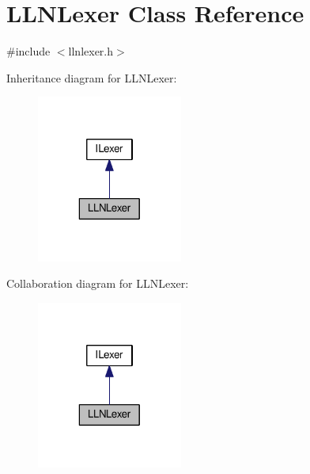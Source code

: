 \hypertarget{class_l_l_n_lexer}{\section{L\-L\-N\-Lexer Class Reference}
\label{class_l_l_n_lexer}
}


{\ttfamily \#include $<$llnlexer.\-h$>$}



Inheritance diagram for L\-L\-N\-Lexer\-:
\nopagebreak
\begin{figure}[H]
\begin{center}
\leavevmode
\includegraphics[width=136pt]{class_l_l_n_lexer__inherit__graph}
\end{center}
\end{figure}


Collaboration diagram for L\-L\-N\-Lexer\-:
\nopagebreak
\begin{figure}[H]
\begin{center}
\leavevmode
\includegraphics[width=136pt]{class_l_l_n_lexer__coll__graph}
\end{center}
\end{figure}

